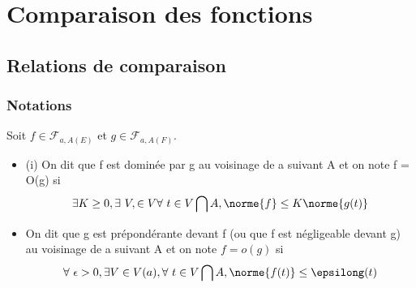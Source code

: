\chapter{Comparaison des fonctions }
\section{Relations de comparaison}

\subsection{Notations}




Soit $f \in \mathcal{F}_{a,A(E)}$ et $g
\in \mathcal{F}_{a,A(F)}$.

\begin{itemize}
  \item
    (i) On dit que f est dominée par g au voisinage de a suivant A et on
    note f = O(g) si
    \[
      \exists K \geq 0, \exists~V, \in V
      \forall~t \in V \bigcap A,
       \norme{f} \leq
       K \norme{g(t)}
    \]
  \item
    On dit que g est prépondérante devant f (ou que f est négligeable
    devant g) au voisinage de a suivant A et on note $f = o(g)$ si
    \[
      \forall~\epsilon > 0,
      \exists V \in V (a), \forall~t \in V
      \bigcap A, \norme{f(t)} \leq
      \epsilong(t)
    \]
\end{itemize}



